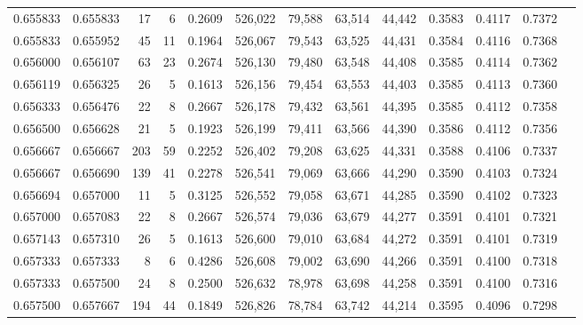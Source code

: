 \begin{tabular}{rrrrrrrrrrrrr}
0.655833 & 0.655833 &    17 &   6 &                                     0.2609 & 526,022 &  79,588 &  63,514 &  44,442 & 0.3583 & 0.4117 & 0.7372 \\
0.655833 & 0.655952 &    45 &  11 &                                     0.1964 & 526,067 &  79,543 &  63,525 &  44,431 & 0.3584 & 0.4116 & 0.7368 \\
0.656000 & 0.656107 &    63 &  23 &                                     0.2674 & 526,130 &  79,480 &  63,548 &  44,408 & 0.3585 & 0.4114 & 0.7362 \\
0.656119 & 0.656325 &    26 &   5 &                                     0.1613 & 526,156 &  79,454 &  63,553 &  44,403 & 0.3585 & 0.4113 & 0.7360 \\
0.656333 & 0.656476 &    22 &   8 &                                     0.2667 & 526,178 &  79,432 &  63,561 &  44,395 & 0.3585 & 0.4112 & 0.7358 \\
0.656500 & 0.656628 &    21 &   5 &                                     0.1923 & 526,199 &  79,411 &  63,566 &  44,390 & 0.3586 & 0.4112 & 0.7356 \\
0.656667 & 0.656667 &   203 &  59 &                                     0.2252 & 526,402 &  79,208 &  63,625 &  44,331 & 0.3588 & 0.4106 & 0.7337 \\
0.656667 & 0.656690 &   139 &  41 &                                     0.2278 & 526,541 &  79,069 &  63,666 &  44,290 & 0.3590 & 0.4103 & 0.7324 \\
0.656694 & 0.657000 &    11 &   5 &                                     0.3125 & 526,552 &  79,058 &  63,671 &  44,285 & 0.3590 & 0.4102 & 0.7323 \\
0.657000 & 0.657083 &    22 &   8 &                                     0.2667 & 526,574 &  79,036 &  63,679 &  44,277 & 0.3591 & 0.4101 & 0.7321 \\
0.657143 & 0.657310 &    26 &   5 &                                     0.1613 & 526,600 &  79,010 &  63,684 &  44,272 & 0.3591 & 0.4101 & 0.7319 \\
0.657333 & 0.657333 &     8 &   6 &                                     0.4286 & 526,608 &  79,002 &  63,690 &  44,266 & 0.3591 & 0.4100 & 0.7318 \\
0.657333 & 0.657500 &    24 &   8 &                                     0.2500 & 526,632 &  78,978 &  63,698 &  44,258 & 0.3591 & 0.4100 & 0.7316 \\
0.657500 & 0.657667 &   194 &  44 &                                     0.1849 & 526,826 &  78,784 &  63,742 &  44,214 & 0.3595 & 0.4096 & 0.7298 \\

\end{tabular}
